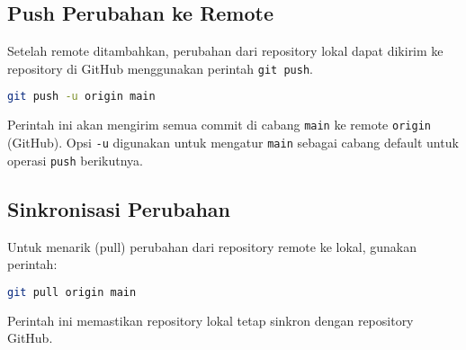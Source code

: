 \subsection{Push Perubahan ke Remote}
Setelah remote ditambahkan, perubahan dari repository lokal dapat dikirim ke repository di GitHub menggunakan perintah \texttt{git push}.
\begin{lstlisting}[language=bash]
	git push -u origin main
\end{lstlisting}
Perintah ini akan mengirim semua commit di cabang \texttt{main} ke remote \texttt{origin} (GitHub). Opsi \texttt{-u} digunakan untuk mengatur \texttt{main} sebagai cabang default untuk operasi \texttt{push} berikutnya.

\subsection{Sinkronisasi Perubahan}
Untuk menarik (pull) perubahan dari repository remote ke lokal, gunakan perintah:
\begin{lstlisting}[language=bash]
	git pull origin main
\end{lstlisting}
Perintah ini memastikan repository lokal tetap sinkron dengan repository GitHub.
